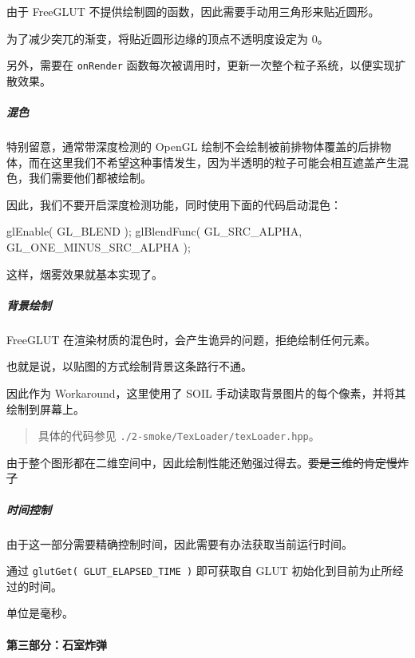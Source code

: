 \documentclass[
]{article}
\newenvironment{Shaded}{}{}
\newcommand{\NormalTok}[1]{#1}
\begin{document}
由于 FreeGLUT 不提供绘制圆的函数，因此需要手动用三角形来贴近圆形。

为了减少突兀的渐变，将贴近圆形边缘的顶点不透明度设定为 0。

另外，需要在 \texttt{onRender}
函数每次被调用时，更新一次整个粒子系统，以便实现扩散效果。

\hypertarget{header-n191}{%
\subparagraph{混色}\label{header-n191}}

特别留意，通常带深度检测的 OpenGL
绘制不会绘制被前排物体覆盖的后排物体，而在这里我们不希望这种事情发生，因为半透明的粒子可能会相互遮盖产生混色，我们需要他们都被绘制。

因此，我们不要开启深度检测功能，同时使用下面的代码启动混色：

\begin{Shaded}
\begin{Highlighting}[]
\NormalTok{glEnable( GL_BLEND );}
\NormalTok{glBlendFunc( GL_SRC_ALPHA, GL_ONE_MINUS_SRC_ALPHA );}
\end{Highlighting}
\end{Shaded}

这样，烟雾效果就基本实现了。

\hypertarget{header-n196}{%
\subparagraph{背景绘制}\label{header-n196}}

FreeGLUT 在渲染材质的混色时，会产生诡异的问题，拒绝绘制任何元素。

也就是说，以贴图的方式绘制背景这条路行不通。

因此作为 Workaround，这里使用了 SOIL
手动读取背景图片的每个像素，并将其绘制到屏幕上。

\begin{quote}
具体的代码参见 \texttt{./2-smoke/TexLoader/texLoader.hpp}。
\end{quote}

由于整个图形都在二维空间中，因此绘制性能还勉强过得去。\sout{要是三维的肯定慢炸了}

\hypertarget{header-n203}{%
\subparagraph{时间控制}\label{header-n203}}

由于这一部分需要精确控制时间，因此需要有办法获取当前运行时间。

通过 \texttt{glutGet(\ GLUT\_ELAPSED\_TIME\ )} 即可获取自 GLUT
初始化到目前为止所经过的时间。

单位是毫秒。

\hypertarget{header-n207}{%
\paragraph{第三部分：石室炸弹}\label{header-n207}}
\end{document}
